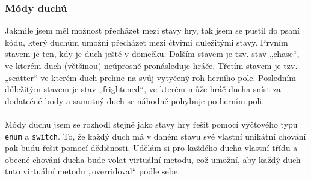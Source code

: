 \documentclass[a4]{article}
\begin{document}
\subsubsection{Módy duchů}
Jakmile jsem měl možnost přecházet mezi stavy hry, tak jsem se pustil do psaní kódu, který duchům umožní přecházet mezi čtyřmi důležitými stavy. Prvním stavem je ten, kdy je duch ještě v domečku. Dalším stavem je tzv. stav „chase“, ve kterém duch (většinou) neúprosně pronásleduje hráče. Třetím stavem je tzv. „scatter“ ve kterém duch prchne na svůj vytyčený roh herního pole. Posledním důležitým stavem je stav „frightened“, ve kterém může hráč ducha sníst za dodatečné body a samotný duch se náhodně pohybuje po herním poli.
\\\\
Módy duchů jsem se rozhodl stejně jako stavy hry řešit pomocí výčtového typu \verb|enum| a \verb|switch|. To, že každý duch má v daném stavu své vlastní unikátní chování pak budu řešit pomocí dědičnosti. Udělám si pro každého ducha vlastní třídu a obecné chování ducha bude volat virtuální metodu, což umožní, aby každý duch tuto virtuální metodu „overridoval“ podle sebe.
\end{document}
